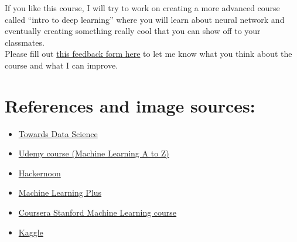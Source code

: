 \documentclass{42-en}
\begin{document}
If you like this course, I will try to work on creating a more advanced course called “intro to deep learning” where you will learn about neural network and eventually creating something really cool that you can show off to your classmates.\\

Please fill out \href{https://goo.gl/forms/PcRd7YRTuRPBDFKx2}{this feedback form here} to let me know what you think about the course and what I can improve.
\section*{References and image sources:}
\begin{itemize}
    \item \href{https://towardsdatascience.com/}{Towards Data Science}
    \item \href{https://www.udemy.com/machinelearning/}{Udemy course (Machine Learning A to Z)}
    \item \href{https://hackernoon.com/}{Hackernoon}
    \item \href{https://www.machinelearningplus.com/}{Machine Learning Plus}
    \item \href{https://www.coursera.org/courses?query=machine\%20learning\%20stanford}{Coursera Stanford Machine Learning course}
    \item \href{https://www.kaggle.com/}{Kaggle}
\end{itemize}
\end{document}
